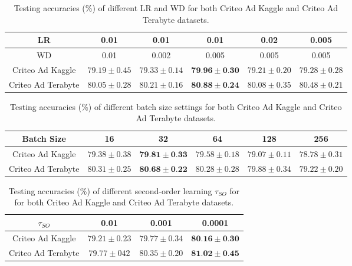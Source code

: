 \documentclass[conference]{IEEEtran}
\begin{document}
\begin{table}[!h]
\centering
\begin{tabular}{cccccc}
\hline
LR & 0.01 & 0.01 & 0.01 & 0.02 & 0.005 \\
\hline
WD & 0.01 & 0.002 & 0.005 & 0.005 & 0.005 \\
\hline
Criteo Ad Kaggle & $79.19 \pm 0.45$ & $79.33 \pm 0.14$ & $\mathbf{7 9 . 9 6} \pm \mathbf{0 . 3 0}$ & $79.21 \pm 0.20$ & $79.28 \pm 0.28$ \\
Criteo Ad Terabyte & $80.05 \pm 0.28$ & $80.21 \pm 0.16$ & $\mathbf{8 0 . 8 8} \pm \mathbf{0 . 2 4}$ & $80.08 \pm 0.35$ & $80.48 \pm 0.21$ \\
\hline
\end{tabular}
\caption{Testing accuracies (\%) of different LR and WD for both Criteo Ad Kaggle and Criteo Ad Terabyte datasets.}
\end{table}

\begin{table}
\centering
\begin{tabular}{cccccc}
\hline
Batch Size & 16 & 32 & 64 & 128 & 256 \\
\hline
Criteo Ad Kaggle & $79.38 \pm 0.38$ & $\mathbf{7 9 . 8 1} \pm \mathbf{0 . 3 3}$ & $79.58 \pm 0.18$ & $79.07 \pm 0.11$ & $78.78 \pm 0.31$ \\
Criteo Ad Terabyte & $80.31 \pm 0.25$ & $\mathbf{8 0 . 6 8} \pm \mathbf{0 . 2 2}$ & $80.28 \pm 0.28$ & $79.88 \pm 0.34$ & $79.22 \pm 0.20$ \\
\hline
\end{tabular}
\caption{Testing accuracies (\%) of different batch size settings for both Criteo Ad Kaggle and Criteo Ad Terabyte datasets.}
\end{table}

\begin{table}[!h]
\begin{tabular}{cccc}
\hline
$\tau_{S O}$ & 0.01 & 0.001 & 0.0001 \\
\hline
Criteo Ad Kaggle & $79.21 \pm 0.23$ & $79.77 \pm 0.34$ & $\mathbf{8 0 . 1 6} \pm \mathbf{0 . 3 0}$ \\
Criteo Ad Terabyte & $79.77 \pm 042$ & $80.35 \pm 0.20$ & $\mathbf{8 1 . 0 2} \pm \mathbf{0 . 4 5}$ \\
\hline
\end{tabular}
\caption{Testing accuracies (\%) of different second-order learning $\tau_{S O}$ for for both Criteo Ad Kaggle and Criteo Ad Terabyte datasets.}
\end{table}
\end{document}
